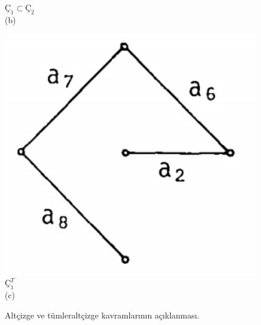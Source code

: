 \documentclass[11pt]{amsbook}
\begin{document}
\begin{figure}[h]
\begin{minipage}{0.32\textwidth}
	    \centering$Ç_1 \subset Ç_2$ \\
    	\centering(b)
        \end{minipage}
        \begin{minipage}{0.32\textwidth}
	    \includegraphics[width=\textwidth]{images/ceyhun-001-10-fig03}
	    \centering$Ç_1^T$ \\
    	\centering(c)
        \end{minipage}
	    \caption{Altçizge ve tümleraltçizge kavramlarının açıklanması.}
	    \label{fig:fig1}
\end{figure}
\end{document}
